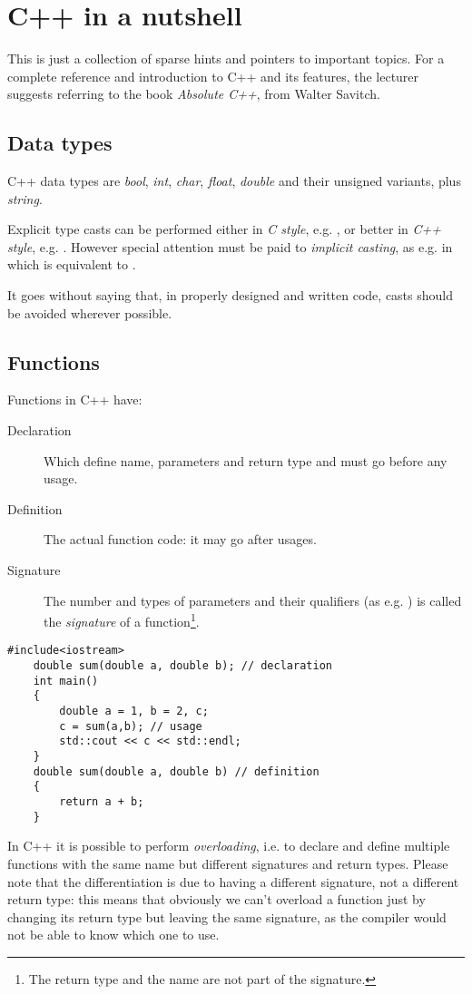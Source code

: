 \section{C++ in a nutshell}
This is just a collection of sparse hints and pointers to important topics. For a complete reference and introduction to C++ and its features, the lecturer suggests referring to the book \emph{Absolute C++}, from Walter Savitch.

\subsection{Data types}
C++ data types are \emph{bool}, \emph{int}, \emph{char}, \emph{float}, \emph{double} and their unsigned variants, plus \emph{string}.

Explicit type casts can be performed either in \emph{C style}, e.g. , or better in \emph{C++ style}, e.g. .
However special attention must be paid to \emph{implicit casting}, as e.g. in  which is equivalent to .

It goes without saying that, in properly designed and written code, casts should be avoided wherever possible.

\subsection{Functions}
Functions in C++ have:
\begin{description}
	\item[Declaration] Which define name, parameters and return type and must go before any usage.
	\item[Definition] The actual function code: it may go after usages.
	\item[Signature] The number and types of parameters and their qualifiers (as e.g. ) is called the \emph{signature} of a function\footnote{The return type and the name are not part of the signature.}.
\end{description}
\begin{lstlisting}[float,frame=tb,caption={Example of declaration, usage and definiton of function.}]
	#include<iostream>
	double sum(double a, double b); // declaration
	int main()
	{
		double a = 1, b = 2, c;
		c = sum(a,b); // usage
		std::cout << c << std::endl;
	}
	double sum(double a, double b) // definition
	{
		return a + b;
	}
\end{lstlisting}
In C++ it is possible to perform \emph{overloading}, i.e. to declare and define multiple functions with the same name but different signatures and return types. Please note that the differentiation is due to having a different signature, not a different return type: this means that obviously we can't overload a function just by changing its return type but leaving the same signature, as the compiler would not be able to know which one to use.

